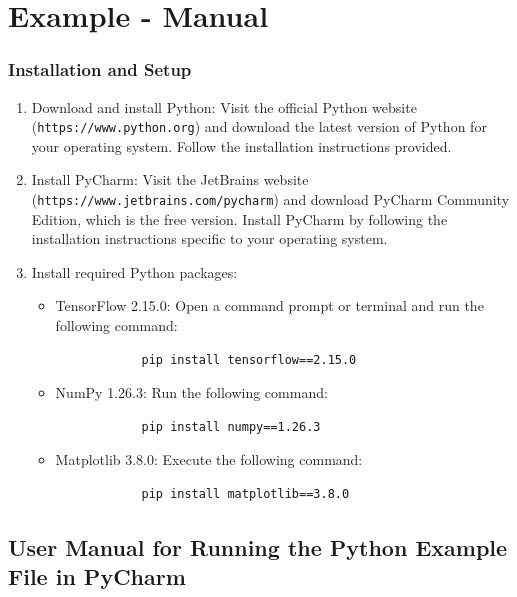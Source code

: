 \section{Example - Manual}



\subsubsection{Installation and Setup}
\label{subsubsection:Setup}

\begin{enumerate}
	\item Download and install Python: Visit the official Python website (\texttt{https://www.python.org}) and download the latest version of Python for your operating system. Follow the installation instructions provided.
	\item Install PyCharm: Visit the JetBrains website (\texttt{https://www.jetbrains.com/pycharm}) and download PyCharm Community Edition, which is the free version. Install PyCharm by following the installation instructions specific to your operating system.
	\item Install required Python packages:
	\begin{itemize}
		\item TensorFlow 2.15.0: Open a command prompt or terminal and run the following command:
		
		\begin{verbatim}
			pip install tensorflow==2.15.0
		\end{verbatim}
		
		\item NumPy 1.26.3: Run the following command:
		
		\begin{verbatim}
			pip install numpy==1.26.3
		\end{verbatim}
		
		\item Matplotlib 3.8.0: Execute the following command:
		
		\begin{verbatim}
			pip install matplotlib==3.8.0
		\end{verbatim}
		
	\end{itemize}
\end{enumerate}

\subsection{User Manual for Running the Python Example File in PyCharm}

